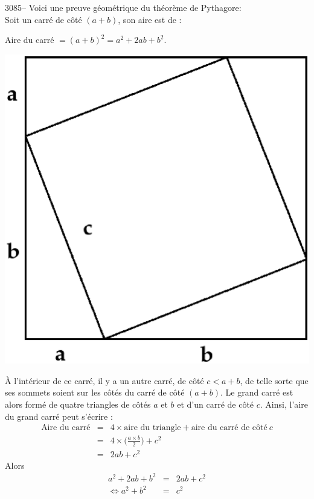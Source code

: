 \documentclass[letterpaper, 12pt]{article}
\begin{document}
3085-- Voici une preuve g\'eom\'etrique du th\'eor\`eme de Pythagore:\\
Soit un carr\'e de c\^ot\'e $(a+b)$, son aire est de :\\
\begin{center}
Aire du carr\'e $ = (a+b)^{2} = a^{2} + 2ab + b^{2}$.
\end{center}
\begin{center}
\includegraphics[scale=0.3]{carrcarre.eps}
\end{center}
\`A l'int\'erieur de ce carr\'e, il y a un autre carr\'e, de c\^ot\'e $c < a+b$, de telle sorte que ses sommets soient sur les c\^ot\'es du carr\'e de c\^ot\'e $(a+b)$. Le grand carr\'e est alors form\'e de quatre triangles de c\^ot\'es $a$ et $b$ et d'un carr\'e de c\^ot\'e $c$.
Ainsi, l'aire du grand carr\'e peut s'\'ecrire :\\
\begin{eqnarray*}
\textrm{Aire du carr\'e} &=& 4 \times  \textrm{aire du triangle} + \textrm{aire du carr\'e de c\^ot\'e} \ c\\
&=& 4 \times  \Big( \frac{a\times b}{2} \Big) + c^{2}\\
&=& 2ab + c^{2}
\end{eqnarray*}
Alors
\begin{eqnarray*}
a^{2} + 2ab + b^{2} &=& 2ab + c^{2}\\
\Leftrightarrow a^{2} + b^{2} &=& c^{2}
\end{eqnarray*}
\end{document}
